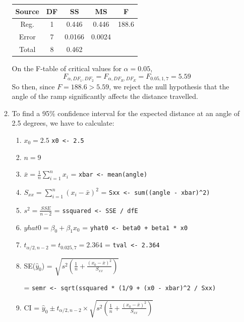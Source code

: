 \documentclass[12pt]{article}
\begin{document}
\begin{enumerate}[1.]
\begin{enumerate}
            \begin{center}
                \begin{tabular}{|c|c|c|c|c|}
                    \hline
                    Source & DF & SS & MS & F \\
                    \hline
                    Reg. & 1 & 0.446 & 0.446 & 188.6 \\
                    Error & 7 & 0.0166 & 0.0024 &  \\
                    Total & 8 & 0.462 &  & \\
                    \hline
                \end{tabular}
            \end{center}
            On the F-table of critical values for $\alpha = 0.05$,
            \[ F_{\alpha, DF_1, DF_2} = F_{\alpha, DF_R, DF_E} = F_{0.05, 1, 7} = 5.59 \]
            So then, since $F = 188.6 > 5.59$, we reject the null hypothesis that 
            the angle of the ramp significantly affects the distance travelled.
            \item To find a 95\% confidence interval for the expected distance at an angle of 2.5 degrees, we have to calculate:
            
            \begin{enumerate}
                \item $x_0 = 2.5$ \texttt{x0 <- 2.5}
                \item $n = 9$
                \item $\bar{x} = \frac{1}{n} \sum_{i=1}^{n} x_i$ = \texttt{xbar <- mean(angle)}
                \item $S_{xx} = \sum_{i=1}^{n} (x_i - \bar{x})^2$ = \texttt{Sxx <- sum((angle - xbar)\^{}2)}
                \item $s^2 = \frac{SSE}{n-2}$ = \texttt{ssquared <- SSE / dfE}
                \item $yhat0 = \beta_0 + \beta_1 x_0$ = \texttt{yhat0 <- beta0 + beta1 * x0}
                \item $t_{\alpha / 2, n-2} = t_{0.025, 7} = 2.364$ = \texttt{tval <- 2.364}
                \item SE($\hat{y}_0$) = $\sqrt{s^2 \left(\frac{1}{n} + \frac{(x_0 - \bar{x})^2}{S_{xx}} \right)}$
                
                = \texttt{semr <- sqrt(ssquared * (1/9 + (x0 - xbar)\^{}2 / Sxx)}
                \item CI = $\hat{y}_0 \pm t_{\alpha / 2, n-2} \times  \sqrt{s^2 \left(\frac{1}{n} + \frac{(x_0 - \bar{x})^2}{S_{xx}} \right)}$
                

\end{enumerate}
\end{enumerate}
\end{enumerate}
\end{document}
